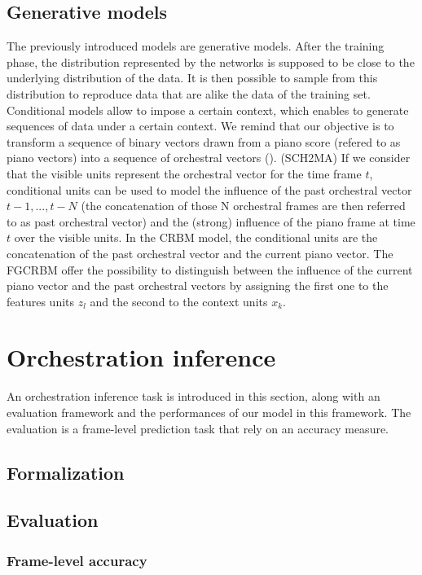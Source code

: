 \documentclass{article} %
\begin{document}
\subsection{Generative models}
The previously introduced models are generative models. After the training phase, the distribution represented by the networks is supposed to be close to the underlying distribution of the data. It is then possible to sample from this distribution to reproduce data that are alike the data of the training set.
Conditional models allow to impose a certain context, which enables to generate sequences of data under a certain context. We remind that our objective is to transform a sequence of binary vectors drawn from a piano score (refered to as piano vectors) into a sequence of orchestral vectors (). (SCH2MA)
If we consider that the visible units represent the orchestral vector for the time frame $t$, conditional units can be used to model the influence of the past orchestral vector $t-1 , ... , t-N$ (the concatenation of those N orchestral frames are then referred to as past orchestral vector) and the (strong) influence of the piano frame at time $t$ over the visible units.
In the CRBM model, the conditional units are the concatenation of the past orchestral vector and the current piano vector. The FGCRBM offer the possibility to distinguish between the influence of the current piano vector and the past orchestral vectors by assigning the first one to the features units $z_{l}$ and the second to the context units $x_{k}$.

\section{Orchestration inference}
An orchestration inference task is introduced in this section, along with an evaluation framework and the performances of our model in this framework. The evaluation is a frame-level prediction task that rely on an accuracy measure.

\subsection{Formalization}
\subsection{Evaluation}
\subsubsection{Frame-level accuracy}
\end{document}
